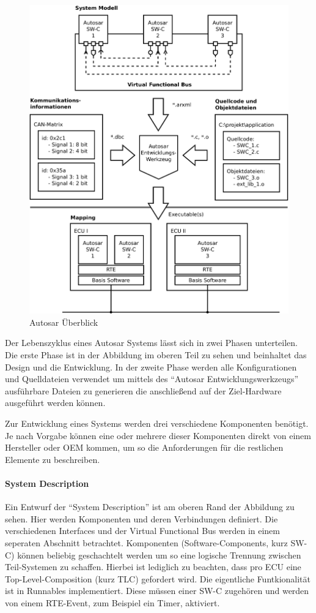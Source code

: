 \documentclass[
  a4paper,					    %
  twoside,
  DIV=calc,     				%
  bibliography=totoc,
  cleardoublepage=empty,
  ngerman,     					%
  final       					%
]{scrbook}
\begin{document}
\begin{figure}[ht]
\centering
\includegraphics[width=1\textwidth]{autosar_overview.png}
\caption{Autosar Überblick}
\label{fig:autosar_overview}
\end{figure}

Der Lebenszyklus eines Autosar Systems lässt sich in zwei Phasen unterteilen. Die erste Phase ist in der Abbildung im oberen Teil zu sehen und beinhaltet das Design und die Entwicklung. In der zweite Phase werden alle Konfigurationen und Quelldateien verwendet um mittels des "`Autosar Entwicklungswerkzeugs"'  ausführbare Dateien zu generieren die anschließend auf der Ziel-Hardware ausgeführt werden können.

Zur Entwicklung eines Systems werden drei verschiedene Komponenten benötigt. Je nach Vorgabe können eine oder mehrere dieser Komponenten direkt von einem Hersteller oder OEM kommen, um so die Anforderungen für die restlichen Elemente zu beschreiben.

\paragraph{System Description} Ein Entwurf der "`System Description"' ist am oberen Rand der Abbildung zu sehen. Hier werden Komponenten und deren Verbindungen definiert. Die verschiedenen Interfaces und der Virtual Functional Bus werden in einem seperaten Abschnitt betrachtet. Komponenten (Software-Components, kurz SW-C) können beliebig geschachtelt werden um so eine logische Trennung zwischen Teil-Systemen zu schaffen. Hierbei ist lediglich zu beachten, dass pro ECU eine Top-Level-Composition (kurz TLC) gefordert wird. Die eigentliche Funtkionalität ist in Runnables implementiert. Diese müssen einer SW-C zugehören und werden von einem RTE-Event, zum Beispiel ein Timer, aktiviert.
\end{document}
